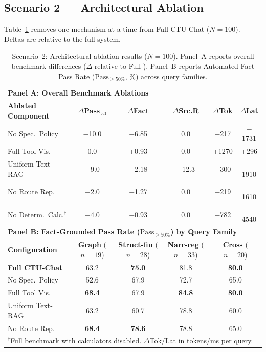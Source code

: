 \subsection{Scenario 2 --- Architectural Ablation}
\label{sec:s2_results}

Table~\ref{tab:ablation} removes one mechanism at a time from Full CTU-Chat ($N{=}100$). Deltas are relative to the full system.

\begin{table}[!htbp]
\centering
\caption{Scenario~2: Architectural ablation results ($N=100$). Panel~A reports overall benchmark differences ($\Delta$ relative to Full \system{}). Panel~B reports Automated Fact Pass Rate ($\text{Pass}_{\ge 50\%}$, \%) across query families.}
\label{tab:ablation}
{\small\setlength{\tabcolsep}{3.5pt}
\begin{tabular}{lccccc}
\toprule
\multicolumn{6}{l}{\textbf{Panel A: Overall Benchmark Ablations}} \\
\textbf{Ablated Component} & \textbf{$\Delta$Pass$_{.50}$} & \textbf{$\Delta$Fact} & \textbf{$\Delta$Src.R} & \textbf{$\Delta$Tok} & \textbf{$\Delta$Lat} \\
\midrule
No Spec.~Policy  & $-$10.0 & $-$6.85 & 0.0  & $-$217  & $-$1731 \\
Full Tool Vis.   & 0.0     & +0.93   & 0.0  & +1270   & +296 \\
Uniform Text-RAG & $-$9.0  & $-$2.18 & $-$12.3 & $-$300  & $-$1910 \\
No Route Rep.    & $-$2.0  & $-$1.27 & 0.0  & $-$219  & $-$1610 \\
No Determ.~Calc.$^\dagger$ & $-$4.0 & $-$0.93 & 0.0 & $-$782 & $-$4540 \\
\midrule
\multicolumn{6}{l}{\textbf{Panel B: Fact-Grounded Pass Rate ($\text{Pass}_{\ge 50\%}$) by Query Family}} \\
\textbf{Configuration} & \textbf{Graph} ($n{=}19$) & \textbf{Struct-fin} ($n{=}28$) & \textbf{Narr-reg} ($n{=}33$) & \multicolumn{2}{c}{\textbf{Cross} ($n{=}20$)} \\
\midrule
\textbf{Full CTU-Chat} & 63.2 & \textbf{75.0} & 81.8 & \multicolumn{2}{c}{\textbf{80.0}} \\
No Spec.~Policy  & 52.6 & 67.9 & 72.7 & \multicolumn{2}{c}{65.0} \\
Full Tool Vis.   & \textbf{68.4} & 67.9 & \textbf{84.8} & \multicolumn{2}{c}{\textbf{80.0}} \\
Uniform Text-RAG & 63.2 & 60.7 & 78.8 & \multicolumn{2}{c}{60.0} \\
No Route Rep.    & \textbf{68.4} & \textbf{78.6} & 78.8 & \multicolumn{2}{c}{65.0} \\
\bottomrule
\multicolumn{6}{l}{\rule{0pt}{2.5ex}\footnotesize $^\dagger$Full benchmark with calculators disabled. $\Delta$Tok/Lat in tokens/ms per query.}
\end{tabular}}
\end{table}

